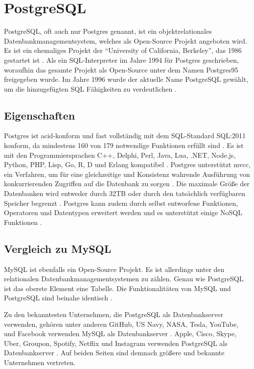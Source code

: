 \clearpage

\section{PostgreSQL}
PostgreSQL, oft auch nur Postgres genannt, ist ein objektrelationales Datenbankmanagementsystem, welches als Open-Source Projekt angeboten wird.
Es ist ein ehemaliges Projekt der \enquote{University of California, Berkeley}, das 1986 gestartet ist \cite{postgres-history}.
Als ein SQL-Interpreter im Jahre 1994 für Postgres geschrieben, woraufhin das gesamte Projekt als Open-Source unter dem Namen Postgres95 freigegeben wurde.
Im Jahre 1996 wurde der aktuelle Name PostgreSQL gewählt, um die hinzugefügten SQL Fähigkeiten zu verdeutlichen \cite{postgres-history}.

\subsection{Eigenschaften}
Postgres ist \gls{acid}-konform und fast vollständig mit dem SQL-Standard SQL:2011 konform, da mindestens 160 von 179 notwendige Funktionen erfüllt sind \cite{postgres-about}.
Es ist mit den Programmiersprachen C++, Delphi, Perl, Java, Lua, .NET, Node.js, Python, PHP, Lisp, Go, R, D und Erlang kompatibel \cite{postgres-mysql-comparison}.
Postgres unterstützt \gls{mvcc}, ein Verfahren, um für eine gleichzeitige und Konsistenz wahrende Ausführung von konkurrierenden Zugriffen auf die Datenbank zu sorgen \cite{postgres-about}. Die maximale Größe der Datenbanken wird entweder durch 32TB oder durch den tatsächlich verfügbaren Speicher begrenzt \cite{postgres-about}. Postgres kann zudem durch selbst entworfene Funktionen, Operatoren und Datentypen erweitert werden und es unterstützt einige NoSQL Funktionen \cite{postgres-about}.

\subsection{Vergleich zu MySQL}
MySQL ist ebenfalls ein Open-Source Projekt. Es ist allerdings unter den relationalen Datenbankmanagementsystemen zu zählen. Genau wie PostgreSQL ist das oberste Element eine Tabelle. Die Funktionalitäten von MySQL und PostgreSQL sind beinahe identisch \cite{postgres-mysql-comparison}.

Zu den bekanntesten Unternehmen, die PostgreSQL als Datenbankserver verwenden, gehören unter anderen GitHub, US Navy, NASA, Tesla, YouTube, und Facebook verwenden MySQL als Datenbankserver \cite{mysql-companies}.
Apple, Cisco, Skype, Uber, Groupon, Spotify, Netflix und Instagram verwenden PostgreSQL als Datenbankserver \cite{postgres-companies}.
Auf beiden Seiten sind demnach größere und bekannte Unternehmen vertreten.

